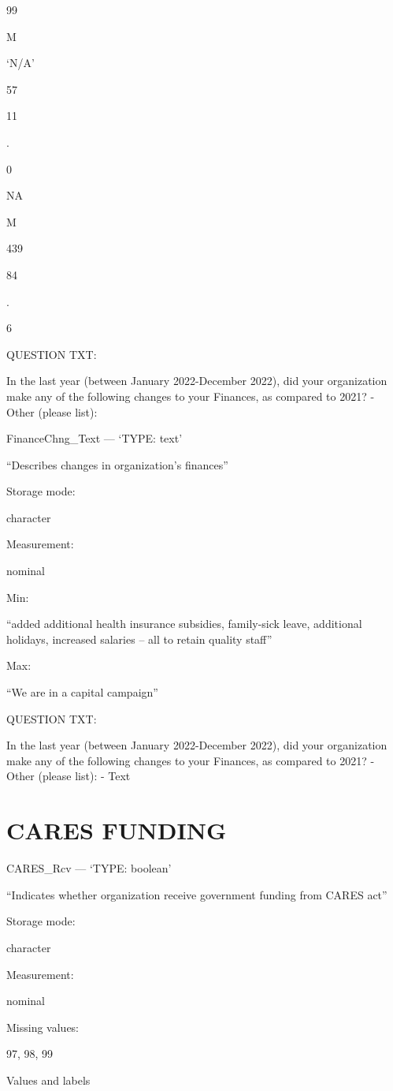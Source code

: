 \documentclass[
  letterpaper,
]{scrbook}
\begin{document}
99

M

`N/A'

57

11

.

0

NA

M

439

84

.

6

QUESTION TXT:

In the last year (between January 2022-December 2022), did your
organization make any of the following changes to your Finances, as
compared to 2021? - Other (please list):

FinanceChng\_Text --- {`TYPE: text'}

``Describes changes in organization's finances''

Storage mode:

character

Measurement:

nominal

Min:

``added additional health insurance subsidies, family-sick leave,
additional holidays, increased salaries -- all to retain quality staff''

Max:

``We are in a capital campaign''

QUESTION TXT:

In the last year (between January 2022-December 2022), did your
organization make any of the following changes to your Finances, as
compared to 2021? - Other (please list): - Text

\chapter{CARES FUNDING}\label{cares-funding-1}

CARES\_Rcv --- {`TYPE: boolean'}

``Indicates whether organization receive government funding from CARES
act''

Storage mode:

character

Measurement:

nominal

Missing values:

97, 98, 99

Values and labels
\end{document}
